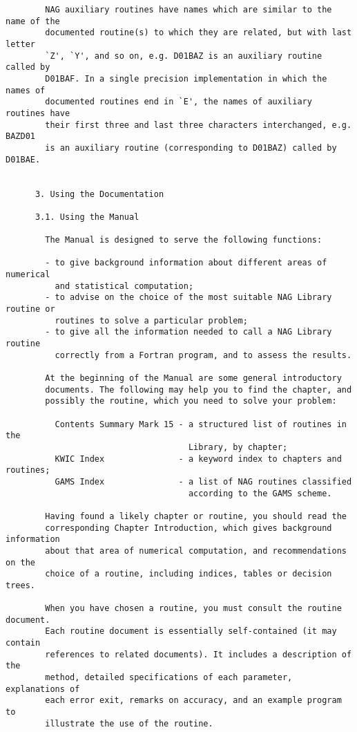 \begin{small}
\begin{verbatim}
        NAG auxiliary routines have names which are similar to the name of the
        documented routine(s) to which they are related, but with last letter
        `Z', `Y', and so on, e.g. D01BAZ is an auxiliary routine called by
        D01BAF. In a single precision implementation in which the names of
        documented routines end in `E', the names of auxiliary routines have
        their first three and last three characters interchanged, e.g. BAZD01
        is an auxiliary routine (corresponding to D01BAZ) called by D01BAE.


      3. Using the Documentation

      3.1. Using the Manual

        The Manual is designed to serve the following functions:

        - to give background information about different areas of numerical
          and statistical computation;
        - to advise on the choice of the most suitable NAG Library routine or
          routines to solve a particular problem;
        - to give all the information needed to call a NAG Library routine
          correctly from a Fortran program, and to assess the results.

        At the beginning of the Manual are some general introductory
        documents. The following may help you to find the chapter, and
        possibly the routine, which you need to solve your problem:

          Contents Summary Mark 15 - a structured list of routines in the
                                     Library, by chapter;
          KWIC Index               - a keyword index to chapters and routines;
          GAMS Index               - a list of NAG routines classified
                                     according to the GAMS scheme.

        Having found a likely chapter or routine, you should read the
        corresponding Chapter Introduction, which gives background information
        about that area of numerical computation, and recommendations on the
        choice of a routine, including indices, tables or decision trees.

        When you have chosen a routine, you must consult the routine document.
        Each routine document is essentially self-contained (it may contain
        references to related documents). It includes a description of the
        method, detailed specifications of each parameter, explanations of
        each error exit, remarks on accuracy, and an example program to
        illustrate the use of the routine.


\end{verbatim}
\end{small}
